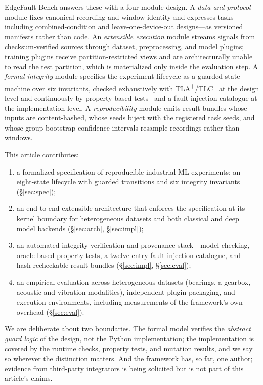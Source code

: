 EdgeFault-Bench answers these with a four-module design. A
\emph{data-and-protocol} module fixes canonical recording and window identity
and expresses tasks---including combined-condition and
leave-one-device-out designs---as versioned manifests rather than code. An
\emph{extensible execution} module streams signals from checksum-verified
sources through dataset, preprocessing, and model plugins; training plugins
receive partition-restricted views and are architecturally unable to read the
test partition, which is materialized only inside the evaluation step. A
\emph{formal integrity} module specifies the experiment lifecycle as a guarded
state machine over six invariants, checked exhaustively with
TLA\textsuperscript{+}/TLC~\cite{lamport2002specifying} at the design level
and continuously by property-based tests~\cite{hypothesis} and a
fault-injection catalogue at the implementation level. A
\emph{reproducibility} module emits result bundles whose inputs are
content-hashed, whose seeds biject with the registered task seeds, and whose
group-bootstrap confidence intervals resample recordings rather than windows.

This article contributes:
\begin{enumerate}
\item a formalized specification of reproducible industrial ML experiments:
an eight-state lifecycle with guarded transitions and six integrity
invariants (\S\ref{sec:spec});
\item an end-to-end extensible architecture that enforces the specification
at its kernel boundary for heterogeneous datasets and both classical and deep
model backends (\S\ref{sec:arch}, \S\ref{sec:impl});
\item an automated integrity-verification and provenance stack---model
checking, oracle-based property tests, a twelve-entry fault-injection
catalogue, and hash-recheckable result bundles (\S\ref{sec:impl},
\S\ref{sec:eval});
\item an empirical evaluation across heterogeneous datasets (bearings,
a gearbox, acoustic and vibration modalities), independent plugin packaging,
and execution environments, including measurements of the framework's own
overhead (\S\ref{sec:eval}).
\end{enumerate}

We are deliberate about two boundaries. The formal model verifies the
\emph{abstract guard logic} of the design, not the Python implementation; the
implementation is covered by the runtime checks, property tests, and mutation
results, and we say so wherever the distinction matters. And the framework
has, so far, one author; evidence from third-party integrators is being
solicited but is not part of this article's claims.

